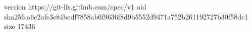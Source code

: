 version https://git-lfs.github.com/spec/v1
oid sha256:a6c2afc3e84bedf7858ab6f9636f8d9b5552d9471a752b261192727b30f58dc1
size 17436
